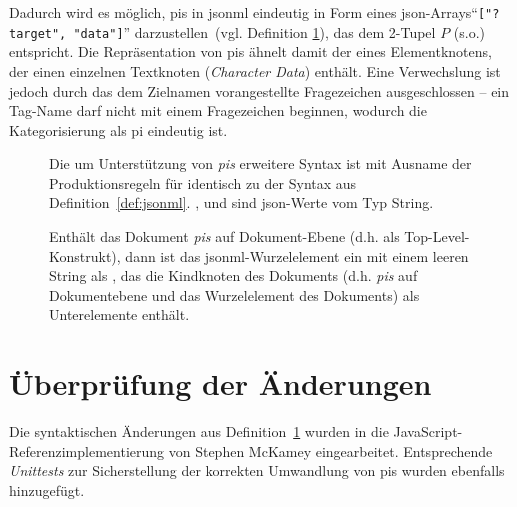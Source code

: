 Dadurch wird es möglich, \glspl{pi} in \acrshort{jsonml} eindeutig in Form eines \acrshort{json}-Arrays\linebreak{}\enquote{\texttt{["?target", "data"]}} darzustellen~(vgl. Definition \ref{def:jsonmlpi}), das dem 2-Tupel $P$ (s.o.) entspricht. Die Repräsentation von \glspl{pi} ähnelt damit der eines Elementknotens, der einen einzelnen Textknoten (\emph{Character Data}) enthält. Eine Verwechslung ist jedoch durch das dem Zielnamen vorangestellte Fragezeichen ausgeschlossen -- ein Tag-Name darf nicht mit einem Fragezeichen beginnen, wodurch die Kategorisierung als \gls{pi} eindeutig ist.  \begin{figure}[h]
    \begin{definition}
        \label{def:jsonmlpi}

        Die um Unterstützung von \emph{\glspl{pi}} erweitere Syntax ist mit Ausname der Produktionsregeln für  identisch zu der Syntax aus Definition~\ref{def:jsonml}.
        ,  und  sind \acrshort{json}-Werte vom Typ String.

        \begin{grammar}
            
        \end{grammar}

        Enthält das Dokument \emph{\glspl{pi}} auf Dokument-Ebene (d.h. als Top-Level-Konstrukt), dann ist das \acrshort{jsonml}-Wurzelelement ein  mit einem leeren String als , das die Kindknoten des Dokuments (d.h. \emph{\glspl{pi}} auf Dokumentebene und das Wurzelelement des Dokuments) als Unterelemente enthält.
    \end{definition}
\end{figure}

\section{Überprüfung der Änderungen}

Die syntaktischen Änderungen aus Definition~\ref{def:jsonmlpi} wurden in die JavaScript-Referenz\-implementierung von Stephen McKamey eingearbeitet. Entsprechende \emph{Unittests} zur Sicherstellung der korrekten Umwandlung von \glspl{pi} wurden ebenfalls hinzugefügt.

